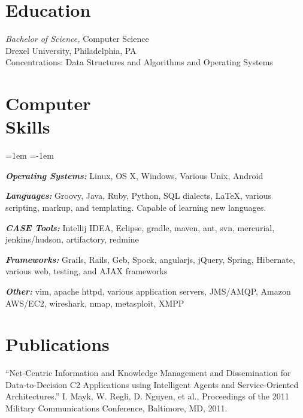\documentclass[margin]{res}
\begin{document}
\begin{resume}

\section{Education} {\sl Bachelor of Science,} Computer Science \\
   Drexel University, Philadelphia, PA \\
   Concentrations: Data Structures and Algorithms and Operating Systems


\section{Computer \\ Skills}
\begin{list}{}%
{\leftmargin=1em \itemindent=-1em}
  \item \textbf{\textit{Operating Systems:}} Linux, OS X, Windows, Various Unix, Android
  \item \textbf{\textit{Languages:}} Groovy, Java, Ruby, Python, SQL dialects, \LaTeX, various scripting, markup, and templating. Capable of learning new languages.
  \item \textbf{\textit{CASE Tools: }}  Intellij IDEA, Eclipse, gradle, maven, ant, svn, mercurial, jenkins/hudson, artifactory, redmine
  \item \textbf{\textit{Frameworks: }}  Grails, Rails, Geb, Spock, angularjs, jQuery, Spring, Hibernate, various web, testing, and AJAX frameworks
  \item \textbf{\textit{Other: }} vim, apache httpd, various application servers, JMS/AMQP, Amazon AWS/EC2, wireshark, nmap, metasploit, XMPP
\end{list}




\section{Publications}
  ``Net-Centric Information and Knowledge Management and Dissemination for Data-to-Decision C2 Applications using Intelligent Agents and Service-Oriented Architectures.'' I. Mayk, W. Regli, D. Nguyen, et al.,  Proceedings of the 2011 Military Communications Conference, Baltimore, MD, 2011. 


\end{resume}
\end{document}
